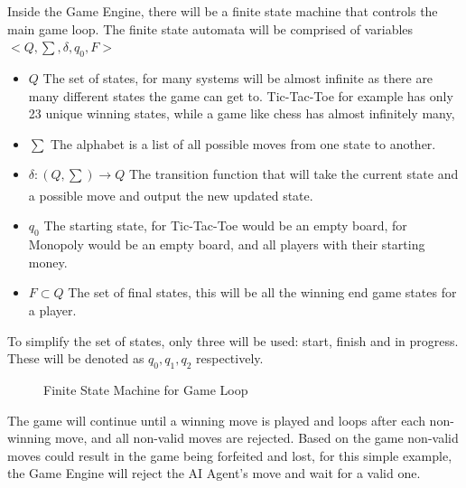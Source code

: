 \documentclass[12pt]{article}
\begin{document}
Inside the Game Engine, there will be a finite state machine that controls the main game loop. The finite state automata will be comprised of variables $<Q, \sum, \delta, q_{0}, F>$
\begin{itemize}
    \item $Q$ The set of states, for many systems will be almost infinite as there are many different states the game can get to. Tic-Tac-Toe for example has only 23 unique winning states, while a game like chess has almost infinitely many,
    \item $\sum$ The alphabet is a list of all possible moves from one state to another.
    \item $\delta:(Q,\sum) \xrightarrow[]{} Q$ The transition function that will take the current state and a possible move and output the new updated state.
    \item $q_0$ The starting state, for Tic-Tac-Toe would be an empty board, for Monopoly would be an empty board, and all players with their starting money.
    \item $F \subset Q$ The set of final states, this will be all the winning end game states for a player.
\end{itemize}
To simplify the set of states, only three will be used: start, finish and in progress. These will be denoted as $q_0, q_1, q_2$ respectively. 

\begin{figure}[h!]
\begin{center}
\caption{Finite State Machine for Game Loop}
\end{center}
\end{figure}
The game will continue until a winning move is played and loops after each non-winning move, and all non-valid moves are rejected. Based on the game non-valid moves could result in the game being forfeited and lost, for this simple example, the Game Engine will reject the AI Agent's move and wait for a valid one.\\ 
\end{document}
